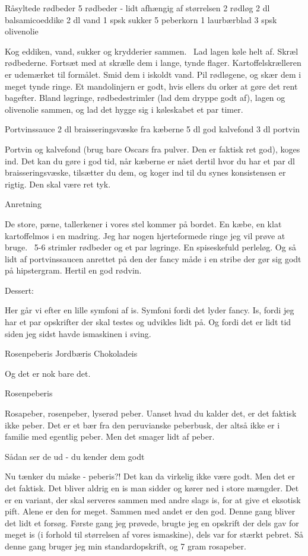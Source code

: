 \documentclass[
]{book}
\begin{document}
Råsyltede rødbeder
5 rødbeder - lidt afhængig af størrelsen
2 rødløg
2 dl balsamicoeddike
2 dl vand
1 spsk sukker
5 peberkorn
1 laurbærblad
3 spsk olivenolie

Kog eddiken, vand, sukker og krydderier sammen.~ Lad lagen køle helt af.
Skræl rødbederne. Fortsæt med at skrælle dem i lange, tynde flager. Kartoffelskrælleren er udemærket til formålet.
Smid dem i iskoldt vand.
Pil rødløgene, og skær dem i meget tynde ringe. Et mandolinjern er godt, hvis ellers du orker at gøre det rent bagefter.
Bland løgringe, rødbedestrimler (lad dem dryppe godt af), lagen og olivenolie sammen, og lad det hygge sig i køleskabet et par timer.

Portvinssauce
2 dl braisseringsvæske fra kæberne
5 dl god kalvefond
3 dl portvin

Portvin og kalvefond (brug bare Oscars fra pulver. Den er faktisk ret god), koges ind. Det kan du gøre i god tid, når kæberne er nået dertil hvor du har et par dl braisseringsvæske, tilsætter du dem, og koger ind til du synes konsistensen er rigtig. Den skal være ret tyk.

Anretning

De store, pæne, tallerkener i vores stel kommer på bordet. En kæbe, en klat kartoffelmos i en madring. Jeg har nogen hjerteformede ringe jeg vil prøve at bruge.~ 5-6 strimler rødbeder og et par løgringe. En spiseskefuld perleløg. Og så lidt af portvinssaucen anrettet på den der fancy måde i en stribe der gør sig godt på hipstergram. Hertil en god rødvin.

Dessert:

Her går vi efter en lille symfoni af is. Symfoni fordi det lyder fancy. Is, fordi jeg har et par opskrifter der skal testes og udvikles lidt på. Og fordi det er lidt tid siden jeg sidst havde ismaskinen i sving.

Rosenpeberis
Jordbæris
Chokoladeis

Og det er nok bare det.

Rosenpeberis

Rosapeber, rosenpeber, lyserød peber. Uanset hvad du kalder det, er det faktisk ikke peber. Det er et bær fra den peruvianske peberbusk, der altså ikke er i familie med egentlig peber. Men det smager lidt af peber.

Sådan ser de ud - du kender dem godt

Nu tænker du måske - peberis?! Det kan da virkelig ikke være godt. Men det er det faktisk. Det bliver aldrig en is man sidder og kører ned i store mængder. Det er en variant, der skal serveres sammen med andre slags is, for at give et eksotisk pift. Alene er den for meget. Sammen med andet er den god. Denne gang bliver det lidt et forsøg. Første gang jeg prøvede, brugte jeg en opskrift der dels gav for meget is (i forhold til størrelsen af vores ismaskine), dels var for stærkt pebret. Så denne gang bruger jeg min standardopskrift, og 7 gram rosapeber.
\end{document}
